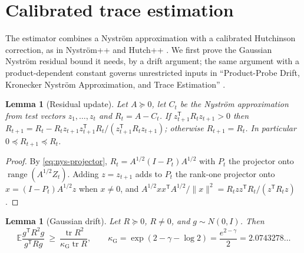 \documentclass[11pt,a4paper]{article}
\newtheorem{lemma}[theorem]{Lemma}
\theoremstyle{definition}
\theoremstyle{remark}
\numberwithin{equation}{section}
\newcommand{\E}{\mathbb E}
\newcommand{\T}{{\mathsf T}}
\newcommand{\tr}{\operatorname{tr}}
\newcommand{\range}{\operatorname{range}}
\newcommand{\norm}[1]{\lVert#1\rVert}
\newcommand{\kapG}{\kappa_{\mathrm G}}
\begin{document}
\section{Calibrated trace estimation}\label{sec:trace}

The estimator combines a Nystr\"om approximation with a calibrated Hutchinson
correction, as in Nystr\"om++ \cite{Nyspp} and Hutch++ \cite{Hutchpp}. We
first prove the Gaussian Nystr\"om residual bound it needs, by a drift
argument; the same argument with a product-dependent constant governs
unrestricted inputs in ``Product-Probe Drift, Kronecker Nystr\"om
Approximation, and Trace Estimation'' \cite{PPD}.

\begin{lemma}[Residual update]\label{lem:update}
Let $A\succeq0$, let $C_t$ be the Nystr\"om approximation from test vectors
$z_1,\ldots,z_t$ and $R_t=A-C_t$. If $z_{t+1}^\T R_tz_{t+1}>0$ then
$R_{t+1}=R_t-R_tz_{t+1}z_{t+1}^\T R_t/(z_{t+1}^\T R_tz_{t+1})$; otherwise
$R_{t+1}=R_t$. In particular $0\preceq R_{t+1}\preceq R_t$.
\end{lemma}

\begin{proof}
By \eqref{eq:nys-projector}, $R_t=A^{1/2}(I-P_t)A^{1/2}$ with $P_t$ the projector
onto $\range(A^{1/2}Z_t)$. Adding $z=z_{t+1}$ adds to $P_t$ the rank-one
projector onto $x=(I-P_t)A^{1/2}z$ when $x\ne0$, and
$A^{1/2}xx^\T A^{1/2}/\norm x^2=R_tzz^\T R_t/(z^\T R_tz)$.
\end{proof}

\begin{lemma}[Gaussian drift]\label{lem:drift}
Let $R\succeq0$, $R\ne0$, and $g\sim N(0,I)$. Then
\[
 \E\frac{g^\T R^2g}{g^\T Rg}\ \ge\ \frac{\tr R^2}{\kapG\tr R},\qquad
 \kapG=\exp(2-\gamma-\log2)=\frac{e^{2-\gamma}}2=2.0743278\ldots
\]
\end{lemma}
\end{document}
